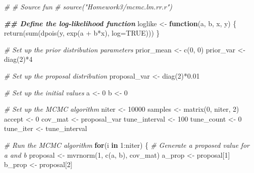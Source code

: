 \documentclass[
]{article}
\newenvironment{Shaded}{\begin{snugshade}}{\end{snugshade}}
\newcommand{\AttributeTok}[1]{\textcolor[rgb]{0.77,0.63,0.00}{#1}}
\newcommand{\CommentTok}[1]{\textcolor[rgb]{0.56,0.35,0.01}{\textit{#1}}}
\newcommand{\ConstantTok}[1]{\textcolor[rgb]{0.00,0.00,0.00}{#1}}
\newcommand{\ControlFlowTok}[1]{\textcolor[rgb]{0.13,0.29,0.53}{\textbf{#1}}}
\newcommand{\DecValTok}[1]{\textcolor[rgb]{0.00,0.00,0.81}{#1}}
\newcommand{\DocumentationTok}[1]{\textcolor[rgb]{0.56,0.35,0.01}{\textbf{\textit{#1}}}}
\newcommand{\FloatTok}[1]{\textcolor[rgb]{0.00,0.00,0.81}{#1}}
\newcommand{\FunctionTok}[1]{\textcolor[rgb]{0.00,0.00,0.00}{#1}}
\newcommand{\NormalTok}[1]{#1}
\newcommand{\OtherTok}[1]{\textcolor[rgb]{0.56,0.35,0.01}{#1}}
\newcommand{\SpecialCharTok}[1]{\textcolor[rgb]{0.00,0.00,0.00}{#1}}
\begin{document}
\begin{Shaded}
\begin{Highlighting}[]
\CommentTok{\# \# Source fun}
\CommentTok{\# source("Homework3/mcmc.lm.rr.r")}

\DocumentationTok{\#\# Define the log{-}likelihood function}
\NormalTok{loglike }\OtherTok{\textless{}{-}} \ControlFlowTok{function}\NormalTok{(a, b, x, y) \{}
  \FunctionTok{return}\NormalTok{(}\FunctionTok{sum}\NormalTok{(}\FunctionTok{dpois}\NormalTok{(y, }\FunctionTok{exp}\NormalTok{(a }\SpecialCharTok{+}\NormalTok{ b}\SpecialCharTok{*}\NormalTok{x), }\AttributeTok{log=}\ConstantTok{TRUE}\NormalTok{)))}
\NormalTok{\}}

\CommentTok{\# Set up the prior distribution parameters}
\NormalTok{prior\_mean }\OtherTok{\textless{}{-}} \FunctionTok{c}\NormalTok{(}\DecValTok{0}\NormalTok{, }\DecValTok{0}\NormalTok{)}
\NormalTok{prior\_var }\OtherTok{\textless{}{-}} \FunctionTok{diag}\NormalTok{(}\DecValTok{2}\NormalTok{)}\SpecialCharTok{*}\DecValTok{4}

\CommentTok{\# Set up the proposal distribution}
\NormalTok{proposal\_var }\OtherTok{\textless{}{-}} \FunctionTok{diag}\NormalTok{(}\DecValTok{2}\NormalTok{)}\SpecialCharTok{*}\FloatTok{0.01}

\CommentTok{\# Set up the initial values}
\NormalTok{a }\OtherTok{\textless{}{-}} \DecValTok{0}
\NormalTok{b }\OtherTok{\textless{}{-}} \DecValTok{0}

\CommentTok{\# Set up the MCMC algorithm}
\NormalTok{niter }\OtherTok{\textless{}{-}} \DecValTok{10000}
\NormalTok{samples }\OtherTok{\textless{}{-}} \FunctionTok{matrix}\NormalTok{(}\DecValTok{0}\NormalTok{, niter, }\DecValTok{2}\NormalTok{)}
\NormalTok{accept }\OtherTok{\textless{}{-}} \DecValTok{0}
\NormalTok{cov\_mat }\OtherTok{\textless{}{-}}\NormalTok{ proposal\_var}
\NormalTok{tune\_interval }\OtherTok{\textless{}{-}} \DecValTok{100}
\NormalTok{tune\_count }\OtherTok{\textless{}{-}} \DecValTok{0}
\NormalTok{tune\_iter }\OtherTok{\textless{}{-}}\NormalTok{ tune\_interval}

\CommentTok{\# Run the MCMC algorithm}
\ControlFlowTok{for}\NormalTok{(i }\ControlFlowTok{in} \DecValTok{1}\SpecialCharTok{:}\NormalTok{niter) \{}
  \CommentTok{\# Generate a proposed value for a and b}
\NormalTok{  proposal }\OtherTok{\textless{}{-}} \FunctionTok{mvrnorm}\NormalTok{(}\DecValTok{1}\NormalTok{, }\FunctionTok{c}\NormalTok{(a, b), cov\_mat)}
\NormalTok{  a\_prop }\OtherTok{\textless{}{-}}\NormalTok{ proposal[}\DecValTok{1}\NormalTok{]}
\NormalTok{  b\_prop }\OtherTok{\textless{}{-}}\NormalTok{ proposal[}\DecValTok{2}\NormalTok{]}
  

\end{Highlighting}
\end{Shaded}
\end{document}
